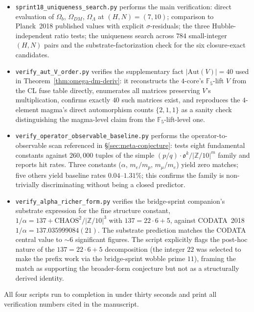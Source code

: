 \documentclass[11pt,reqno]{amsart}
\theoremstyle{plain}
\theoremstyle{definition}
\theoremstyle{remark}
\newcommand{\Z}{\mathbb{Z}}
\newcommand{\F}{\mathbb{F}}
\newcommand{\Aut}{\mathrm{Aut}}
\begin{document}
\begin{itemize}\setlength\itemsep{0pt}
\item \texttt{sprint18\_uniqueness\_search.py} performs the main
verification: direct evaluation of $\Omega_b$, $\Omega_{DM}$,
$\Omega_\Lambda$ at $(H, N) = (7, 10)$; comparison to Planck~2018
published values with explicit $\sigma$-residuals; the three
Hubble-independent ratio tests; the uniqueness search across $784$
small-integer $(H, N)$ pairs and the substrate-factorization check
for the six closure-exact candidates.

\item \texttt{verify\_aut\_V\_order.py} verifies the supplementary
fact $|\Aut(V)| = 40$ used in
Theorem~\ref{thm:omega-dm-deriv}: it reconstructs the $4$-core's
$\F_5$-lift $V$ from the CL fuse table directly, enumerates
all matrices preserving $V$'s multiplication, confirms exactly
$40$ such matrices exist, and reproduces the $4$-element magma's
direct automorphism counts $\{2, 1, 1\}$ as a sanity check
distinguishing the magma-level claim from the $\F_5$-lift-level
one.

\item \texttt{verify\_operator\_observable\_baseline.py}
performs the operator-to-observable scan referenced in
\S\ref{sec:meta-conjecture}: tests eight fundamental constants
against $260{,}000$ tuples of the simple
$(p/q) \cdot \mathfrak{o}^{k}/|\Z/10|^{m}$ family and reports
hit rates. Three constants ($\alpha$, $m_e/m_p$, $m_\mu/m_e$)
yield zero matches; five others yield baseline rates
$0.04$--$1.31\%$; this confirms the family is non-trivially
discriminating without being a closed predictor.

\item \texttt{verify\_alpha\_richer\_form.py}
verifies the bridge-sprint companion's substrate expression for
the fine structure constant,
$1/\alpha = 137 + \mathrm{CHAOS}^{2}/|\Z/10|^{3}$ with
$137 = 22 \cdot 6 + 5$, against CODATA~2018
$1/\alpha = 137.035999084(21)$. The substrate prediction matches
the CODATA central value to $\sim 6$ significant figures. The
script explicitly flags the post-hoc nature of the
$137 = 22 \cdot 6 + 5$ decomposition (the integer $22$ was
selected to make the prefix work via the bridge-sprint wobble
prime $11$), framing the match as supporting the broader-form
conjecture but not as a structurally derived identity.
\end{itemize}

All four scripts run to completion in under thirty seconds and
print all verification numbers cited in the manuscript.
\end{document}
